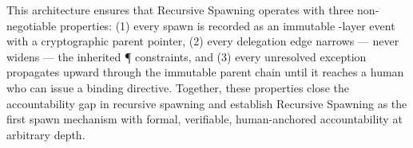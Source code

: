 This architecture ensures that Recursive Spawning operates with three non-negotiable properties: (1) every spawn is recorded as an immutable \F{}-layer event with a cryptographic parent pointer, (2) every delegation edge narrows — never widens — the inherited \P{} constraints, and (3) every unresolved exception propagates upward through the immutable parent chain until it reaches a human who can issue a binding directive. Together, these properties close the accountability gap in recursive spawning and establish Recursive Spawning as the first spawn mechanism with formal, verifiable, human-anchored accountability at arbitrary depth.





